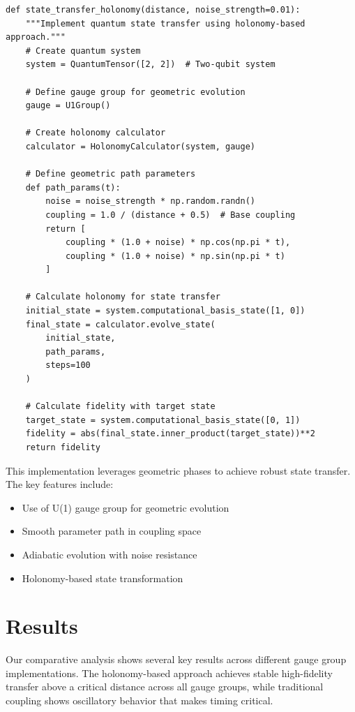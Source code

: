 \documentclass[12pt]{article}
\begin{document}
\begin{lstlisting}[caption=Holonomy-based quantum state transfer implementation]
def state_transfer_holonomy(distance, noise_strength=0.01):
    """Implement quantum state transfer using holonomy-based approach."""
    # Create quantum system
    system = QuantumTensor([2, 2])  # Two-qubit system
    
    # Define gauge group for geometric evolution
    gauge = U1Group()
    
    # Create holonomy calculator
    calculator = HolonomyCalculator(system, gauge)
    
    # Define geometric path parameters
    def path_params(t):
        noise = noise_strength * np.random.randn()
        coupling = 1.0 / (distance + 0.5)  # Base coupling
        return [
            coupling * (1.0 + noise) * np.cos(np.pi * t),
            coupling * (1.0 + noise) * np.sin(np.pi * t)
        ]
    
    # Calculate holonomy for state transfer
    initial_state = system.computational_basis_state([1, 0])
    final_state = calculator.evolve_state(
        initial_state,
        path_params,
        steps=100
    )
    
    # Calculate fidelity with target state
    target_state = system.computational_basis_state([0, 1])
    fidelity = abs(final_state.inner_product(target_state))**2
    return fidelity
\end{lstlisting}

This implementation leverages geometric phases to achieve robust state transfer. The key features include:
\begin{itemize}
\item Use of U(1) gauge group for geometric evolution
\item Smooth parameter path in coupling space
\item Adiabatic evolution with noise resistance
\item Holonomy-based state transformation
\end{itemize}

\section{Results}
Our comparative analysis shows several key results across different gauge group implementations. The holonomy-based approach achieves stable high-fidelity transfer above a critical distance across all gauge groups, while traditional coupling shows oscillatory behavior that makes timing critical.
\end{document}
